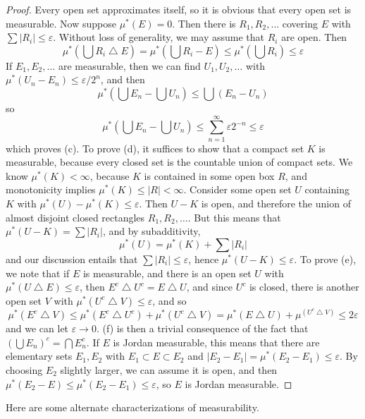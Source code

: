 \begin{proof}
  Every open set approximates itself, so it is obvious that every open set is measurable. Now suppose $\mu^*(E) = 0$. Then there is $R_1, R_2, \dots$ covering $E$ with $\sum |R_i| \leq \varepsilon$. Without loss of generality, we may assume that $R_i$ are open. Then
  \[ \mu^*(\bigcup R_i \bigtriangleup E) = \mu^*(\bigcup R_i - E) \leq \mu^*(\bigcup R_i) \leq \varepsilon \]
  If $E_1, E_2, \dots$ are measurable, then we can find $U_1, U_2 ,\dots$ with $\mu^*(U_n - E_n) \leq \varepsilon/2^n$, and then
  \[ \mu^* \left( \bigcup E_n - \bigcup U_n \right) \leq \bigcup (E_n - U_n) \]
  so
  \[ \mu^* \left( \bigcup E_n - \bigcup U_n \right) \leq \sum_{n = 1}^\infty \varepsilon 2^{-n} \leq \varepsilon \]
  which proves (c). To prove (d), it suffices to show that a compact set $K$ is measurable, because every closed set is the countable union of compact sets. We know $\mu^*(K) < \infty$, because $K$ is contained in some open box $R$, and monotonicity implies $\mu^*(K) \leq |R| < \infty$. Consider some open set $U$ containing $K$ with $\mu^*(U) - \mu^*(K) \leq \varepsilon$. Then $U - K$ is open, and therefore the union of almost disjoint closed rectangles $R_1, R_2, \dots$. But this means that $\mu^*(U - K) = \sum |R_i|$, and by subadditivity,
  \[ \mu^*(U) = \mu^*(K) + \sum |R_i| \]
  and our discussion entails that $\sum |R_i| \leq \varepsilon$, hence $\mu^*(U - K) \leq \varepsilon$. To prove (e), we note that if $E$ is measurable, and there is an open set $U$ with $\mu^*(U \bigtriangleup E) \leq \varepsilon$, then $E^c \bigtriangleup U^c = E \bigtriangleup U$, and since $U^c$ is closed, there is another open set $V$ with $\mu^*(U^c \bigtriangleup V) \leq \varepsilon$, and so
  \[ \mu^*(E^c \bigtriangleup V) \leq \mu^*(E^c \bigtriangleup U^c) + \mu^*(U^c \bigtriangleup V) = \mu^*(E \bigtriangleup U) + \mu^(U^c \bigtriangleup V) \leq 2\varepsilon \]
  and we can let $\varepsilon \to 0$. (f) is then a trivial consequence of the fact that $(\bigcup E_n)^c = \bigcap E_n^c$. If $E$ is Jordan measurable, this means that there are elementary sets $E_1, E_2$ with $E_1 \subset E \subset E_2$ and $|E_2 - E_1| = \mu^*(E_2 - E_1) \leq \varepsilon$. By choosing $E_2$ slightly larger, we can assume it is open, and then $\mu^*(E_2 - E) \leq \mu^*(E_2 - E_1) \leq \varepsilon$, so $E$ is Jordan measurable.
\end{proof}

Here are some alternate characterizations of measurability.

